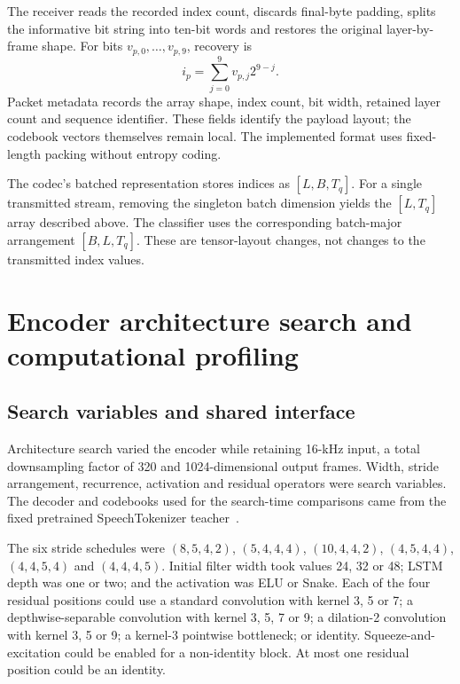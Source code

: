 The receiver reads the recorded index count, discards final-byte padding, splits the informative bit string into ten-bit words and restores the original layer-by-frame shape. For bits $v_{p,0},\ldots,v_{p,9}$, recovery is
\begin{equation}
 i_p=\sum_{j=0}^{9}v_{p,j}2^{9-j}.
 \label{eq:sv2-unpack}
\end{equation}
Packet metadata records the array shape, index count, bit width, retained layer count and sequence identifier. These fields identify the payload layout; the codebook vectors themselves remain local. The implemented format uses fixed-length packing without entropy coding.

The codec's batched representation stores indices as $[L,B,T_q]$. For a single transmitted stream, removing the singleton batch dimension yields the $[L,T_q]$ array described above. The classifier uses the corresponding batch-major arrangement $[B,L,T_q]$. These are tensor-layout changes, not changes to the transmitted index values.

\section{Encoder architecture search and computational profiling}
\label{sec:sv2-nas}

\subsection{Search variables and shared interface}
Architecture search varied the encoder while retaining 16-kHz input, a total downsampling factor of 320 and 1024-dimensional output frames. Width, stride arrangement, recurrence, activation and residual operators were search variables. The decoder and codebooks used for the search-time comparisons came from the fixed pretrained SpeechTokenizer teacher~\cite{speechtokenizer}.

The six stride schedules were $(8,5,4,2)$, $(5,4,4,4)$, $(10,4,4,2)$, $(4,5,4,4)$, $(4,4,5,4)$ and $(4,4,4,5)$. Initial filter width took values 24, 32 or 48; LSTM depth was one or two; and the activation was ELU or Snake. Each of the four residual positions could use a standard convolution with kernel 3, 5 or 7; a depthwise-separable convolution with kernel 3, 5, 7 or 9; a dilation-2 convolution with kernel 3, 5 or 9; a kernel-3 pointwise bottleneck; or identity. Squeeze-and-excitation could be enabled for a non-identity block. At most one residual position could be an identity.

